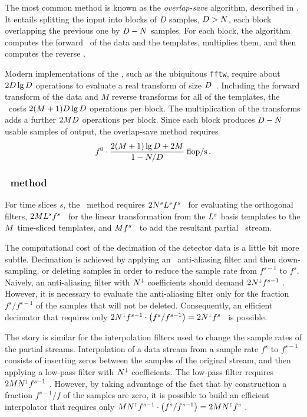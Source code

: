 The most common \FD{} method is known as the \emph{overlap-save} algorithm, described in \citep{numerical-recipes-chapter-13}.  It entails splitting the input into blocks of $D$ samples, $D > N$, each block overlapping the previous one by $D - N$ samples.  For each block, the algorithm computes the forward \fft\ of the data and the templates, multiplies them, and then computes the reverse \fft.

Modern implementations of the \fft, such as the ubiquitous \texttt{fftw}, require about $2 D \lg D$ operations to evaluate a real transform of size $D$~\citep{Johnson:2007p9654}.  Including the forward transform of the data and $M$ reverse transforms for all of the templates, the \fft\ costs $2 (M + 1) D \lg D$ operations per block.  The multiplication of the transforms adds a further $2 M D$ operations per block.  Since each block produces $D - N$ usable samples of output, the overlap-save method requires
$$
f^0 \cdot \frac{2 (M + 1) \lg D + 2 M}{1 - N/D} \; \mathrm{flop/s} \,.
$$

\subsubsection{\lloid\ method}

For time slices $s$, the \lloid\ method requires $2 N^s L^s f^s$ \flops\ 
for evaluating the orthogonal filters, $2 M L^s f^s$ \flops\ for the 
linear transformation from the $L^s$ basis templates to the $M$ time-sliced templates, and $M f^s$ \flops\ to add the resultant partial \SNR\ stream.

The computational cost of the decimation of the detector data is a little bit more subtle.  Decimation is achieved by applying an \fir\ anti-aliasing filter and then down-sampling, or deleting samples in order to reduce the sample rate from $f^{s-1}$ to $f^s$.  Naively, an anti-aliasing filter with $N^\shortdownarrow$ coefficients should demand $2 N^\shortdownarrow f^{s-1}$ \flops.  However, it is necessary to evaluate the anti-aliasing filter only for the fraction $f^s / f^{s-1}$ of the samples that will not be deleted.  Consequently, an efficient decimator that requires only $2 N^\shortdownarrow f^{s-1} \cdot \left( f^s / f^{s-1} \right) = 2 N^\shortdownarrow f^s$ \flops\ is possible.

The story is similar for the interpolation filters used to change the sample rates of the partial \SNR{} streams.  Interpolation of a data stream from a sample rate $f^s$ to $f^{s-1}$ consists of inserting zeros between the samples of the original stream, and then applying a low-pass filter with $N^\shortdownarrow$ coefficients.  The low-pass filter requires $2 M N^\shortdownarrow f^{s-1}$ \flops.  However, by taking advantage of the fact that by construction a fraction $f^{s-1}/f$ of the samples are zero, it is possible to build an efficient interpolator that requires only $M N^\shortuparrow f^{s-1} \cdot \left( f^s / f^{s-1} \right) = 2 M N^\shortuparrow f^s$ \flops.

